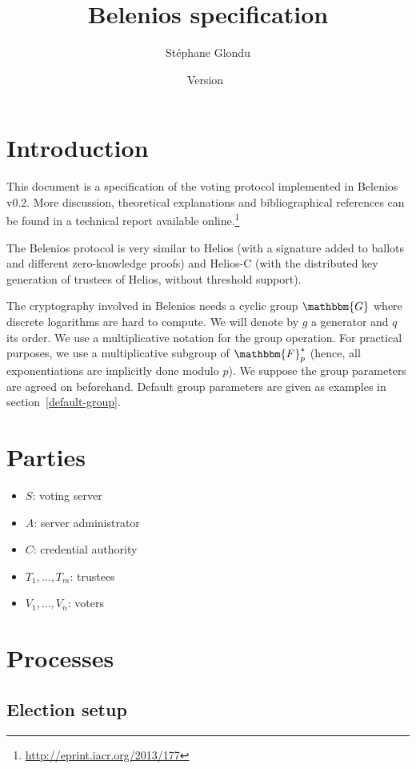 \documentclass[a4paper]{article}
\title{Belenios specification}
\date{Version~\version}
\author{Stéphane Glondu}
\newcommand{\version}{0.2}
\newcommand{\F}{\mathbbm{F}}
\newcommand{\G}{\mathbbm{G}}
\begin{document}
\maketitle
\tableofcontents

\section{Introduction}

This document is a specification of the voting protocol implemented in
Belenios v\version. More discussion, theoretical explanations and
bibliographical references can be found in a technical report
available online.\footnote{\url{http://eprint.iacr.org/2013/177}}

The Belenios protocol is very similar to Helios (with a signature
added to ballots and different zero-knowledge proofs) and Helios-C
(with the distributed key generation of trustees of Helios, without
threshold support).

The cryptography involved in Belenios needs a cyclic group $\G$ where
discrete logarithms are hard to compute. We will denote by $g$ a
generator and $q$ its order. We use a multiplicative notation for the
group operation. For practical purposes, we use a multiplicative
subgroup of $\F^*_p$ (hence, all exponentiations are implicitly done
modulo $p$). We suppose the group parameters are agreed on
beforehand. Default group parameters are given as examples in
section~\ref{default-group}.

\section{Parties}

\begin{itemize}
\item $S$: voting server
\item $A$: server administrator
\item $C$: credential authority
\item $T_1,\dots,T_m$: trustees
\item $V_1,\dots,V_n$: voters
\end{itemize}

\section{Processes}
\label{processes}

\subsection{Election setup}
\label{election-setup}
\end{document}
